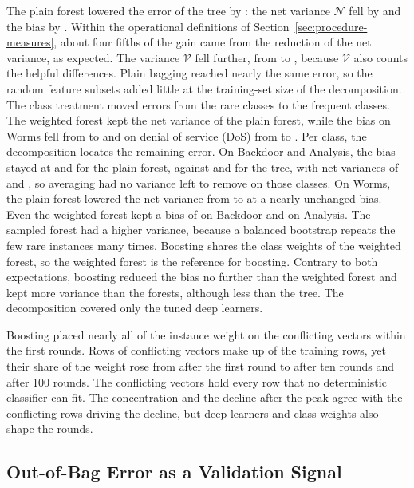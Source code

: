 \documentclass[10pt,conference]{IEEEtran}
\begin{document}
The plain forest lowered the error of the tree by \OBvRfErrorDrop{}: the net variance $\mathcal{N}$ fell by \OBvRfNetDrop{} and the bias by \OBvRfBiasDrop{}. Within the operational definitions of Section~\ref{sec:procedure-measures}, about four fifths of the gain came from the reduction of the net variance, as expected. The variance $\mathcal{V}$ fell further, from \OBvTreeV{} to \OBvRfV{}, because $\mathcal{V}$ also counts the helpful differences. Plain bagging reached nearly the same error, so the random feature subsets added little at the training-set size of the decomposition. The class treatment moved errors from the rare classes to the frequent classes. The weighted forest kept the net variance of the plain forest, while the bias on Worms fell from \OBvRfBSeven{} to \OBvRfWBSeven{} and on denial of service (DoS) from \OBvRfBThree{} to \OBvRfWBThree{}. Per class, the decomposition locates the remaining error. On Backdoor and Analysis, the bias stayed at \OBvRfBTwo{} and \OBvRfBFive{} for the plain forest, against \OBvTreeBTwo{} and \OBvTreeBFive{} for the tree, with net variances of \OBvRfNTwo{} and \OBvRfNFive{}, so averaging had no variance left to remove on those classes. On Worms, the plain forest lowered the net variance from \OBvTreeNSeven{} to \OBvRfNSeven{} at a nearly unchanged bias. Even the weighted forest kept a bias of \OBvRfWBTwo{} on Backdoor and \OBvRfWBFive{} on Analysis. The sampled forest had a higher variance, because a balanced bootstrap repeats the few rare instances many times. Boosting shares the class weights of the weighted forest, so the weighted forest is the reference for boosting. Contrary to both expectations, boosting reduced the bias no further than the weighted forest and kept more variance than the forests, although less than the tree. The decomposition covered only the tuned deep learners.

Boosting placed nearly all of the instance weight on the conflicting vectors within the first rounds. Rows of conflicting vectors make up \OBwConfRows{} of the training rows, yet their share of the weight rose from \OBwConfOne{} after the first round to \OBwConfTen{} after ten rounds and \OBwConfHundred{} after 100 rounds. The conflicting vectors hold every row that no deterministic classifier can fit. The concentration and the decline after the peak agree with the conflicting rows driving the decline, but deep learners and class weights also shape the rounds.

\subsection{Out-of-Bag Error as a Validation Signal}
\label{sec:res-oob}
\end{document}
